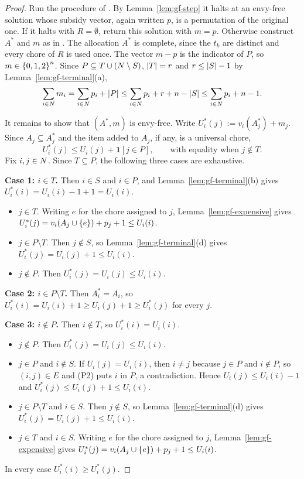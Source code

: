 \begin{proof}
Run the procedure of . By Lemma~\ref{lem:gf-step} it halts
at an envy-free solution whose subsidy vector, again written $p$, is a
permutation of the original one. If it halts with $R=\emptyset$, return this
solution with $m=p$. Otherwise construct $A^\ast$ and $m$ as in
. The allocation $A^\ast$ is complete, since the $t_k$
are distinct and every chore of $R$ is used once. The vector $m-p$ is the
indicator of $P$, so $m\in\left\{0,1,2\right\}^n$. Since
$P\subseteq T\cup(N\setminus S)$, $\left\lvert T\right\rvert=r$ and $r\le\left\lvert S\right\rvert-1$ by
Lemma~\ref{lem:gf-terminal}(a),
\[
  \sum_{i\in N}m_i=\sum_{i\in N}p_i+\left\lvert P\right\rvert
  \le\sum_{i\in N}p_i+r+n-\left\lvert S\right\rvert
  \le\sum_{i\in N}p_i+n-1 .
\]

It remains to show that $(A^\ast,m)$ is envy-free. Write
$U^\ast_i(j):=v_i(A^\ast_j)+m_j$. Since $A_j\subseteq A^\ast_j$ and the item
added to $A_j$, if any, is a universal chore,
\[
  U^\ast_i(j)\le U_i(j)+\mathbf{1}[j\in P],
  \qquad\text{with equality when }j\notin T.
\]
Fix $i,j\in N$. Since $T\subseteq P$, the following three cases are
exhaustive.

\smallskip\noindent\textbf{Case 1: $i\in T$.} Then $i\in S$ and $i\in P$, and
Lemma~\ref{lem:gf-terminal}(b) gives $U^\ast_i(i)=U_i(i)-1+1=U_i(i)$.
\begin{itemize}
  \item[(1a)] $j\in T$. Writing $e$ for the chore assigned to $j$,
    Lemma~\ref{lem:gf-expensive} gives
    $U^\ast_i(j)=v_i(A_j\cup\left\{e\right\})+p_j+1\le U_i(i)$.
  \item[(1b)] $j\in P\setminus T$. Then $j\notin S$, so
    Lemma~\ref{lem:gf-terminal}(d) gives $U^\ast_i(j)=U_i(j)+1\le U_i(i)$.
  \item[(1c)] $j\notin P$. Then $U^\ast_i(j)=U_i(j)\le U_i(i)$.
\end{itemize}

\smallskip\noindent\textbf{Case 2: $i\in P\setminus T$.} Then $A^\ast_i=A_i$, so
$U^\ast_i(i)=U_i(i)+1\ge U_i(j)+1\ge U^\ast_i(j)$ for every $j$.

\smallskip\noindent\textbf{Case 3: $i\notin P$.} Then $i\notin T$, so
$U^\ast_i(i)=U_i(i)$.
\begin{itemize}
  \item[(3a)] $j\notin P$. Then $U^\ast_i(j)=U_i(j)\le U_i(i)$.
  \item[(3b)] $j\in P$ and $i\notin S$. If $U_i(j)=U_i(i)$, then $i\ne j$
    because $j\in P$ and $i\notin P$, so $(i,j)\in E$ and (P2) puts $i$ in $P$,
    a contradiction. Hence $U_i(j)\le U_i(i)-1$ and
    $U^\ast_i(j)\le U_i(j)+1\le U_i(i)$.
  \item[(3c)] $j\in P\setminus T$ and $i\in S$. Then $j\notin S$, so
    Lemma~\ref{lem:gf-terminal}(d) gives $U^\ast_i(j)=U_i(j)+1\le U_i(i)$.
  \item[(3d)] $j\in T$ and $i\in S$. Writing $e$ for the chore assigned to $j$,
    Lemma~\ref{lem:gf-expensive} gives
    $U^\ast_i(j)=v_i(A_j\cup\left\{e\right\})+p_j+1\le U_i(i)$.
\end{itemize}
In every case $U^\ast_i(i)\ge U^\ast_i(j)$.


\end{proof}
